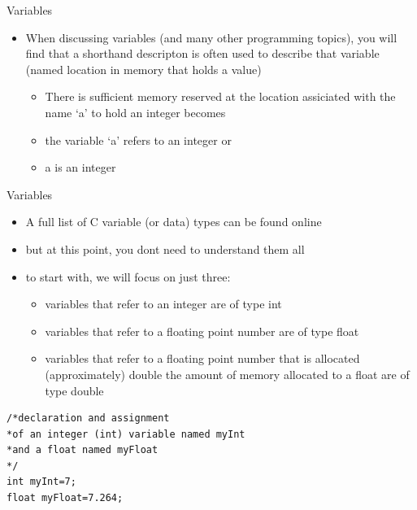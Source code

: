 \documentclass{beamer}
\begin{document}
\begin{frame}[fragile]
Variables
\begin{itemize}
\item When discussing variables (and many other programming topics), you will find that a shorthand descripton is often used to describe that variable (named location in memory that holds a value)
\begin{itemize}
\item There is sufficient memory reserved at the location assiciated with the name `a' to hold an integer becomes
\item the variable `a' refers to an integer or
\item a is an integer
\end{itemize}
\end{itemize}
\end{frame}


\begin{frame}[fragile]
Variables
\begin{itemize}
\item A full list of C variable (or data) types can be found online
\item but at this point, you dont need to understand them all
\item to start with, we will focus on just three:
\begin{itemize}
\item variables that refer to an integer are of type int
\item variables that refer to a floating point number are of type float
\item variables that refer to a floating point number that is allocated (approximately) double the amount of memory allocated to a float are of type double
\end{itemize}
\end{itemize}
\end{frame}

\begin{frame}[fragile]
\begin{block}{}
\begin{lstlisting}
/*declaration and assignment 
*of an integer (int) variable named myInt
*and a float named myFloat
*/
int myInt=7;
float myFloat=7.264;
\end{lstlisting}
\end{block}
\end{frame}
\end{document}
